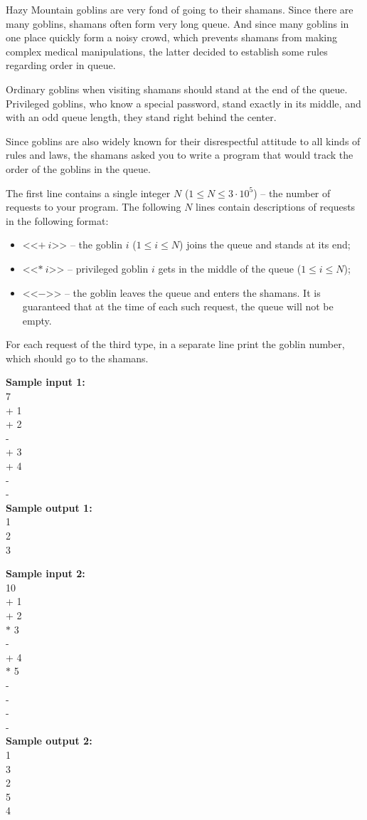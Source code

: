 \documentclass[a4paper]{article}
\begin{document}
Hazy Mountain goblins are very fond of going to their shamans. Since there are many goblins, shamans often form very long queue. And since many goblins in one place quickly form a noisy crowd, which prevents shamans from making complex medical manipulations, the latter decided to establish some rules regarding order in queue.

Ordinary goblins when visiting shamans should stand at the end of the queue. Privileged goblins, who know a special password, stand exactly in its middle, and with an odd queue length, they stand right behind the center.

Since goblins are also widely known for their disrespectful attitude to all kinds of rules and laws, the shamans asked you to write a program that would track the order of the goblins in the queue.

The first line contains a single integer $N$ ($1 \le N \le 3 \cdot 10^5$) -- the number of requests to your program. The following $N$ lines contain descriptions of requests in the following format:

\begin{itemize}
\item <<$+ \ i$>> -- the goblin $i$ ($1 \le i \le N$) joins the queue and stands at its end;
\item <<$* \ i$>> -- privileged goblin $i$ gets in the middle of the queue ($1 \le i \le N$);
\item <<$-$>> -- the goblin leaves the queue and enters the shamans. It is guaranteed that at the time of each such request, the queue will not be empty.
\end{itemize}

For each request of the third type, in a separate line print the goblin number, which should go to the shamans.

\LINE

\noindent \textbf{Sample input 1:}\\
7\\
+ 1\\
+ 2\\
- \\
+ 3\\
+ 4\\
-\\
-\\


\noindent \textbf{Sample output 1:}\\
1\\
2\\
3\\


\SPACE


\noindent \textbf{Sample input 2:}\\
10\\
+ 1\\
+ 2\\
$*$ 3\\
- \\
+ 4\\
$*$ 5\\
- \\
- \\
- \\
- \\


\noindent \textbf{Sample output 2:}\\
1\\
3\\
2\\
5\\
4\\
\end{document}
